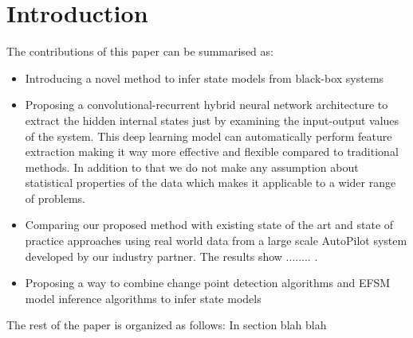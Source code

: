 \section{Introduction}
The contributions of this paper can be summarised as:
\begin{itemize}
    \item Introducing a novel method to infer state models from black-box systems
    \item Proposing a convolutional-recurrent hybrid neural network architecture to extract the hidden internal states just by examining the input-output values of the system. This deep learning model can automatically perform feature extraction making it way more effective and flexible compared to traditional methods. In addition to that we do not make any assumption about statistical properties of the data which makes it applicable to a wider range of problems.
    \item Comparing our proposed method with existing state of the art and state of practice approaches using real world data from a large scale AutoPilot system developed by our industry partner.
    The results show ........ .
    \item Proposing a way to combine change point detection algorithms and EFSM model inference algorithms to infer state models 
\end{itemize}

The rest of the paper is organized as follows: In section blah blah